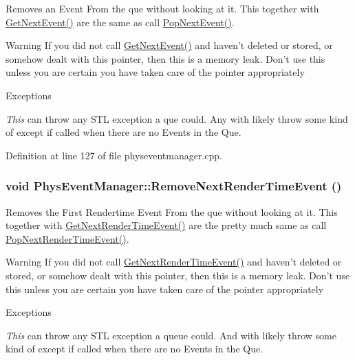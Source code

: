 Removes an Event From the que without looking at it. This together with \hyperlink{classPhysEventManager_a6de94bc6c23dcbd7e15785cadee2e80b}{GetNextEvent()} are the same as call \hyperlink{classPhysEventManager_a3122b32172326ac32cfecc828b820977}{PopNextEvent()}. \begin{DoxyWarning}{Warning}
If you did not call \hyperlink{classPhysEventManager_a6de94bc6c23dcbd7e15785cadee2e80b}{GetNextEvent()} and haven't deleted or stored, or somehow dealt with this pointer, then this is a memory leak. Don't use this unless you are certain you have taken care of the pointer appropriately 
\end{DoxyWarning}

\begin{DoxyExceptions}{Exceptions}
\item[{\em This}]can throw any STL exception a que could. Any with likely throw some kind of except if called when there are no Events in the Que. \end{DoxyExceptions}


Definition at line 127 of file physeventmanager.cpp.\hypertarget{classPhysEventManager_a56acc075e743921e27284c023b3298ce}{
\subsubsection[{RemoveNextRenderTimeEvent}]{\setlength{\rightskip}{0pt plus 5cm}void PhysEventManager::RemoveNextRenderTimeEvent ()}}
\label{d5/dd7/classPhysEventManager_a56acc075e743921e27284c023b3298ce}


Removes the First Rendertime Event From the que without looking at it. This together with \hyperlink{classPhysEventManager_a1f2d0506ce816176913e5bdfaa9fd724}{GetNextRenderTimeEvent()} are the pretty much same as call \hyperlink{classPhysEventManager_ad627925363fdbcff98e0faef204e81e2}{PopNextRenderTimeEvent()}. \begin{DoxyWarning}{Warning}
If you did not call \hyperlink{classPhysEventManager_a1f2d0506ce816176913e5bdfaa9fd724}{GetNextRenderTimeEvent()} and haven't deleted or stored, or somehow dealt with this pointer, then this is a memory leak. Don't use this unless you are certain you have taken care of the pointer appropriately 
\end{DoxyWarning}

\begin{DoxyExceptions}{Exceptions}
\item[{\em This}]can throw any STL exception a queue could. And with likely throw some kind of except if called when there are no Events in the Que. \end{DoxyExceptions}



